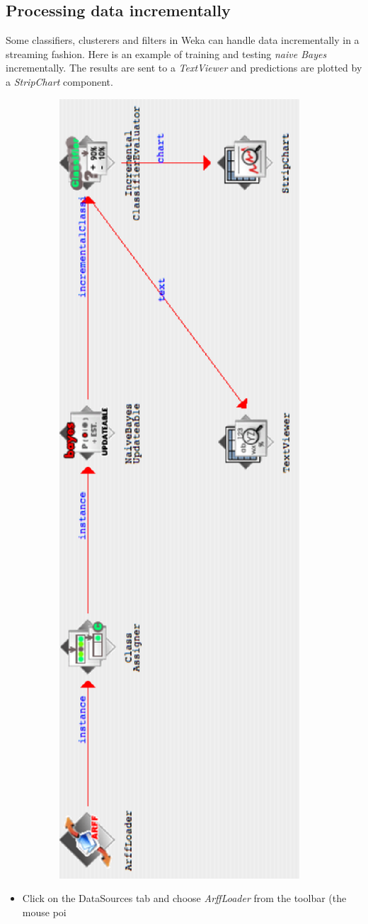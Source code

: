 \documentclass[a4paper]{article}
\begin{document}

\newpage
\subsection{Processing data incrementally}

Some classifiers, clusterers and filters in Weka can handle data incrementally
in a streaming fashion. Here is an example of training and testing \textit{naive Bayes}
incrementally. The results are sent to a \textit{TextViewer} and predictions are plotted
by a \textit{StripChart} component.

\begin{center}
  \includegraphics[angle=270,width=13cm]{images/IncrementalFlow.eps}
\end{center}

\begin{itemize}
        \item Click on the DataSources tab and choose \textit{ArffLoader} from the
	toolbar (the mouse poi
\end{itemize}
\end{document}
